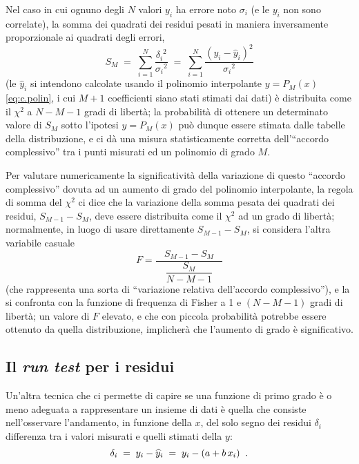 Nel caso in cui ognuno degli $N$ valori $y_i$ ha errore noto
$\sigma_i$ (e le $y_i$ non sono correlate), la somma dei
quadrati dei residui%
pesati in maniera inversamente proporzionale ai quadrati
degli errori,
\begin{equation*}
  S_M \; = \; \sum_{i=1}^N \frac{ {\delta_i}^2 }{
    {\sigma_i}^2 } \; = \; \sum_{i=1}^N \frac{\left( y_i -
    \widehat y_i \right)^2}{ {\sigma_i}^2 }
\end{equation*}
(le $\widehat y_i$ si intendono calcolate usando il
polinomio interpolante $y = P_M(x)$ \eqref{eq:c.polin}, i
cui $M+1$ coefficienti siano stati stimati dai dati) \`e
distribuita come il $\chi^2$ a $N - M - 1$ gradi di
libert\`a; la probabilit\`a di ottenere un determinato
valore di $S_M$ sotto l'ipotesi $y = P_M(x)$ pu\`o dunque
essere stimata dalle tabelle della distribuzione, e ci d\`a
una misura statisticamente corretta dell'``accordo
complessivo'' tra i punti misurati ed un polinomio di grado
$M$.

Per valutare numericamente la significativit\`a della
variazione di questo ``accordo complessivo'' dovuta ad un
aumento di grado del polinomio interpolante, la regola di
somma del $\chi^2$ ci dice che la variazione della somma
pesata dei quadrati dei residui, $S_{M-1} - S_M$, deve
essere distribuita come il $\chi^2$ ad un grado di
libert\`a; normalmente, in luogo di usare direttamente
$S_{M-1} - S_M$, si considera l'altra variabile casuale
\begin{equation*}
  F = \frac{\phantom{m} S_{M-1} - S_M \phantom{m}}{
    \dfrac{S_M}{N - M - 1} }
\end{equation*}
(che rappresenta una sorta di ``variazione relativa
dell'accordo complessivo''), e la si confronta con la
funzione di frequenza di Fisher a 1 e $(N - M - 1)$ gradi di
libert\`a; un valore di $F$ elevato, e che con piccola
probabilit\`a potrebbe essere ottenuto da quella
distribuzione, implicher\`a che l'aumento di grado \`e
significativo.

\subsection{Il \emph{run test} per i residui}%
%
Un'altra tecnica che ci permette di capire se una funzione
di primo grado \`e o meno adeguata a rappresentare un
insieme di dati \`e quella che consiste nell'osservare
l'andamento, in funzione della $x$, del solo segno dei
residui $\delta_i$ differenza tra i valori misurati e quelli
stimati della $y$:
\begin{equation*}
  \delta_i \; = \; y_i - \widehat{y}_i \; = \; y_i - (a + b
  \, x_i) \;\; .
\end{equation*}

